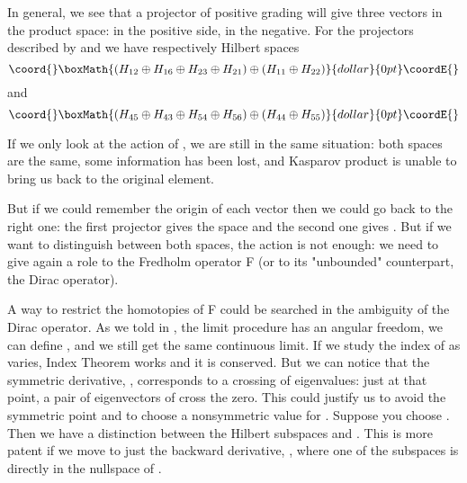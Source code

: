 \documentclass[a4paper,10pt]{article}
\begin{document}
In general, we see that a projector \coordHE{} of positive grading will give three
vectors in the
product space: \coordHE{} in the positive side, \coordHE{} in the
negative. For the projectors described by \coordHE{} and 
\coordHE{} we have respectively Hilbert spaces
$$\coord{}\boxMath{(H_{12}\oplus H_{16}\oplus H_{23}\oplus H_{21})\oplus (H_{11} \oplus H_{22})
}{dollar}{0pt}\coordE{}$$ and 
$$\coord{}\boxMath{(H_{45}\oplus H_{43}\oplus H_{54}\oplus H_{56}) \oplus (H_{44} \oplus H_{55})
}{dollar}{0pt}\coordE{}$$  
 
If we only look at the action of \coordHE{}, we are still in the same 
situation: both spaces are the same, 
some information has been lost, and Kasparov product
\coordHE{} is unable to bring us back to the original
element. 

But if we could remember the origin of each vector then
we could go back to the right one: the first projector gives the
space \coordHE{} and the second one gives 
      \coordHE{}.  But if we want to distinguish between both
spaces, the \coordHE{} action is not enough: we need to give again a role
to the Fredholm operator F (or to its "unbounded" counterpart, the
Dirac operator).


A way to restrict the homotopies of F could be searched in the ambiguity of the
Dirac operator. As we told in \cite{previous}, the limit procedure has
an angular freedom, we can define \coordHE{},
\coordHE{} and we still get the same continuous
limit. If we study the index of \coordHE{} as \myHighlight{$\theta$}\coordHE{} varies, Index Theorem works
and it is conserved. But we can notice that the symmetric derivative,
\coordHE{}, corresponds to a crossing of eigenvalues: just at that
point, a pair of eigenvectors of \coordHE{} cross the zero. This could justify us
to avoid the symmetric point and to choose a nonsymmetric value for \myHighlight{$\theta$}\coordHE{}.
Suppose you choose \coordHE{}. Then we have a distinction between the
Hilbert subspaces \coordHE{} and \coordHE{}. This is more patent if 
we move to just the backward derivative, \coordHE{}, where one of the
subspaces is directly in the nullspace of \coordHE{}.
\end{document}
